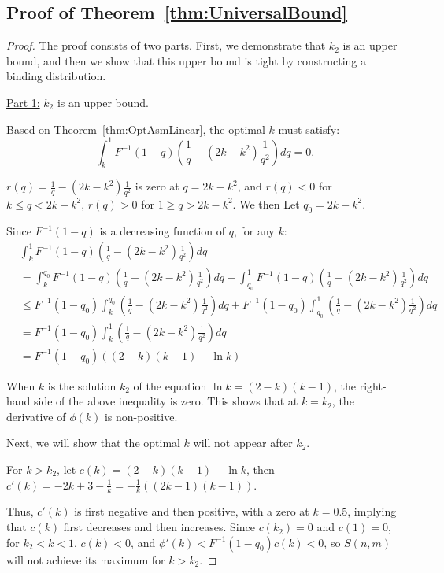 \subsection*{Proof of Theorem~\ref{thm:UniversalBound}}
\begin{proof}
The proof consists of two parts. First, we demonstrate that \(k_2\) is an upper bound, and then we show that this upper bound is tight by constructing a binding distribution.

\underline{Part 1:} \(k_2\) is an upper bound.

Based on Theorem~\ref{thm:OptAsmLinear}, the optimal \(k\) must satisfy:
\[
\int_k^1 F^{-1}(1-q)\left(\frac{1}{q}-(2k-k^2)\frac{1}{q^2}\right)dq=0.
\]

\(r(q)=\frac{1}{q}-(2k-k^2)\frac{1}{q^2}\) is zero at \(q=2k-k^2\), and \(r(q)<0\) for \(k \le q < 2k-k^2\), \(r(q)>0\) for \(1 \ge q > 2k-k^2\). We then Let \(q_0=2k-k^2\).

Since \(F^{-1}(1-q)\) is a decreasing function of \(q\), for any \(k\):
\[
\begin{aligned}
&\int_k^1 F^{-1}(1-q)\left(\frac{1}{q}-(2k-k^2)\frac{1}{q^2}\right)dq \\
&=\int_k^{q_0} F^{-1}(1-q)\left(\frac{1}{q}-(2k-k^2)\frac{1}{q^2}\right)dq+\int_{q_0}^1 F^{-1}(1-q)\left(\frac{1}{q}-(2k-k^2)\frac{1}{q^2}\right)dq \\
&\le F^{-1}(1-q_0)\int_k^{q_0}\left(\frac{1}{q}-(2k-k^2)\frac{1}{q^2}\right)dq+F^{-1}(1-q_0)\int_{q_0}^1\left(\frac{1}{q}-(2k-k^2)\frac{1}{q^2}\right)dq \\
&= F^{-1}(1-q_0)\int_k^1\left(\frac{1}{q}-(2k-k^2)\frac{1}{q^2}\right)dq \\
&= F^{-1}(1-q_0)\left((2-k)(k-1)-\ln k \right)
\end{aligned}
\]

When \(k\) is the solution \(k_2\) of the equation \(\ln k = (2-k)(k-1)\), the right-hand side of the above inequality is zero. This shows that at \(k=k_2\), the derivative of \(\phi(k)\) is non-positive.

Next, we will show that the optimal $k$ will not appear after $k_2$. 

For \(k>k_2\), let \(c(k)=(2-k)(k-1)-\ln k\), then \(c'(k)=-2k+3-\frac{1}{k}=-\frac{1}{k}\left((2k-1)(k-1)\right)\).

Thus, \(c'(k)\) is first negative and then positive, with a zero at \(k=0.5\), implying that \(c(k)\) first decreases and then increases. Since \(c(k_2)=0\) and \(c(1)=0\), for \(k_2< k < 1\), \(c(k)<0\), and $\phi'(k) < F^{-1}(1-q_0)c(k) < 0$, so \(S(n,m)\) will not achieve its maximum for \(k>k_2\).


\end{proof}
